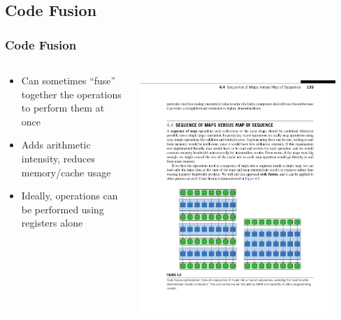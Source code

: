 \documentclass[xcolor=dvipsnames]{beamer}
\begin{document}
	\subsection{Code Fusion}
		\begin{frame} \frametitle{Code Fusion}
			\begin{columns}
        		\begin{column}{0.48\textwidth}
          			\begin{itemize}
            			\item Can sometimes ``fuse'' together the operations 
                        to perform them at once
            			\item Adds arithmetic intensity, reduces memory/cache 
                        usage
            			\item Ideally, operations can be performed using 
                        registers alone
          			\end{itemize}
        		\end{column}
        	\begin{column}{0.48\textwidth}
	        	\centering
		        \includegraphics[width=0.9\textwidth]{images/figure-4-2-2}
            \end{column}
           \end{columns}
		\end{frame}
\end{document}

